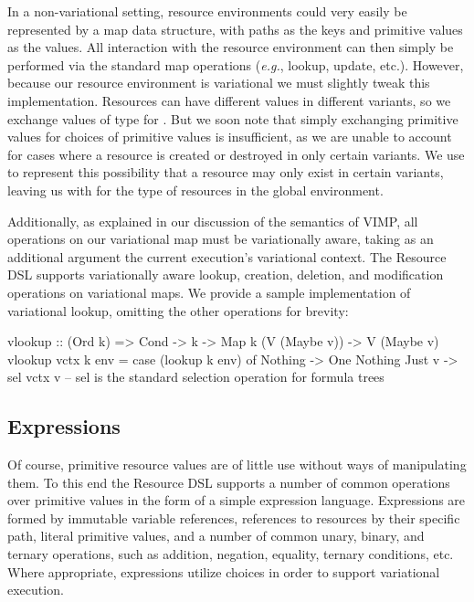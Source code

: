 \documentclass[letterpaper,10pt,onecolumn]{article}
\begin{document}
In a non-variational setting, resource environments could very easily be represented by a map data structure,
with paths as the keys and primitive values as the values. All interaction with the resource environment can then
simply be performed via the standard map operations (\emph{e.g.}, lookup, update, etc.). However, because our resource environment
is variational we must slightly tweak this implementation. Resources can have different values in different
variants, so we exchange values of type  for . But we soon note that simply exchanging primitive values
for choices of primitive values is insufficient, as we are unable to
account for cases where a resource is created or destroyed in only certain variants. We use  to represent this possibility
that a resource may only exist in certain variants, leaving us with  for the type of resources in the global environment.

Additionally, as explained in our discussion of the semantics of VIMP, all operations on our variational map must be variationally aware,
taking as an additional argument the current execution's variational context. The Resource DSL supports variationally aware lookup,
creation, deletion, and modification operations on variational maps. We provide a sample implementation of variational lookup, omitting
the other operations for brevity:

\begin{program}
vlookup :: (Ord k) => Cond -> k -> Map k (V (Maybe v)) -> V (Maybe v)
vlookup vctx k env = case (lookup k env) of
    Nothing -> One Nothing
    Just v -> sel vctx v  -- sel is the standard selection operation for formula trees
\end{program}

\subsection{Expressions}

Of course, primitive resource values are of little use without ways of manipulating them. To this end the Resource DSL supports
a number of common operations over primitive values in the form of a simple expression language. Expressions are formed by
immutable variable references, references to resources by their specific path, literal primitive values, and a number of common unary, binary, and ternary
operations, such as addition, negation, equality, ternary conditions, etc. Where appropriate, expressions utilize choices in order to support
variational execution.
\end{document}
